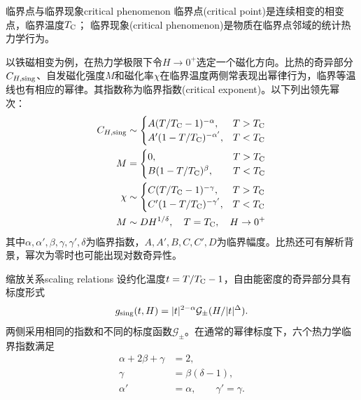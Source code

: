 \begin{definition}
	{临界点与临界现象}{critical phenomenon}
	临界点(critical point)是连续相变的相变点，临界温度$T_\mathrm C$；
	临界现象(critical phenomenon)是物质在临界点邻域的统计热力学行为。

	以铁磁相变为例，在热力学极限下令$H \to 0^+$选定一个磁化方向。比热的奇异部分$C_{H,\rm sing}$、自发磁化强度$M$和磁化率$\chi$在临界温度两侧常表现出幂律行为，临界等温线也有相应的幂律。其指数称为临界指数(critical exponent)。以下列出领先幂次：
	\begin{subequations}
		\begin{align}
			C_{H,\rm sing} &\sim \begin{cases}
				A(T/T_\mathrm C - 1)^{-\alpha}, & T > T_\mathrm C \\
				A'(1 - T/T_\mathrm C)^{-\alpha'}, & T < T_\mathrm C
			\end{cases}\\
			M &= \begin{cases}
				0, & T > T_\mathrm C \\
				B(1 - T/T_\mathrm C)^{\beta},\phantom{\quad} & T < T_\mathrm C
			\end{cases}\\
			\chi &\sim \begin{cases}
				C(T/T_\mathrm C - 1)^{-\gamma}, & T > T_\mathrm C \\
				C'(1 - T/T_\mathrm C)^{-\gamma'}, & T < T_\mathrm C
			\end{cases}\\
			M &\sim DH^{1/\delta},\quad T = T_\mathrm C,\quad H \to 0^+
		\end{align}
	\end{subequations}
	其中$\alpha,\alpha',\beta,\gamma,\gamma',\delta$为临界指数，$A,A',B,C,C',D$为临界幅度。比热还可有解析背景，幂次为零时也可能出现对数奇异性。
\end{definition}

\begin{theorem}
	{缩放关系}{scaling relations}
	设约化温度$t = T/T_\mathrm C - 1$，自由能密度的奇异部分具有标度形式
	\begin{equation}
		\label{eq:sm-scaling-ansatz}
		g_{\rm sing}(t,H) = |t|^{2-\alpha}\mathcal G_\pm(H/|t|^\Delta).
	\end{equation}
	两侧采用相同的指数和不同的标度函数$\mathcal G_\pm$。在通常的幂律标度下，六个热力学临界指数满足
	\begin{subequations}
		\begin{align}
			\alpha + 2\beta + \gamma &= 2,\\
			\gamma &= \beta(\delta - 1),\\
			\alpha' &= \alpha,\qquad\gamma' = \gamma .
		\end{align}
	\end{subequations}
\end{theorem}

